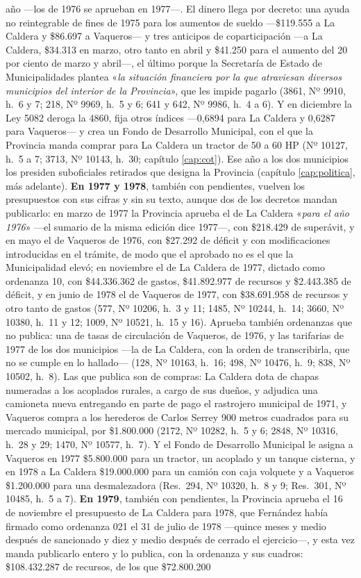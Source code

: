 año ---los de 1976 se aprueban en 1977---. El dinero llega por decreto: una ayuda no reintegrable de fines de 1975 para los aumentos de sueldo ---\$119.555 a La Caldera y \$86.697 a Vaqueros--- y tres anticipos de coparticipación ---a La Caldera, \$34.313 en marzo, otro tanto en abril y \$41.250 para el aumento del 20 por ciento de marzo y abril---, el último porque la Secretaría de Estado de Municipalidades plantea «\textit{la situación financiera por la que atraviesan diversos municipios del interior de la Provincia}», que les impide pagarlo (3861, Nº 9910, h.\ 6 y 7; 218, Nº 9969, h.\ 5 y 6; 641 y 642, Nº 9986, h.\ 4 a 6). Y en diciembre la Ley 5082 deroga la 4860, fija otros índices ---0,6894 para La Caldera y 0,6287 para Vaqueros--- y crea un Fondo de Desarrollo Municipal, con el que la Provincia manda comprar para La Caldera un tractor de 50 a 60 HP (Nº 10127, h.\ 5 a 7; 3713, Nº 10143, h.\ 30; capítulo \ref{cap:cot}). Ese año a los dos municipios los presiden suboficiales retirados que designa la Provincia (capítulo \ref{cap:politica}, más adelante). \textbf{En 1977 y 1978}, también con pendientes, vuelven los presupuestos con sus cifras y sin su texto, aunque dos de los decretos mandan publicarlo: en marzo de 1977 la Provincia aprueba el de La Caldera «\textit{para el año 1976}» ---el sumario de la misma edición dice 1977---, con \$218.429 de superávit, y en mayo el de Vaqueros de 1976, con \$27.292 de déficit y con modificaciones introducidas en el trámite, de modo que el aprobado no es el que la Municipalidad elevó; en noviembre el de La Caldera de 1977, dictado como ordenanza 10, con \$44.336.362 de gastos, \$41.892.977 de recursos y \$2.443.385 de déficit, y en junio de 1978 el de Vaqueros de 1977, con \$38.691.958 de recursos y otro tanto de gastos (577, Nº 10206, h.\ 3 y 11; 1485, Nº 10244, h.\ 14; 3660, Nº 10380, h.\ 11 y 12; 1009, Nº 10521, h.\ 15 y 16). Aprueba también ordenanzas que no publica: una de tasas de circulación de Vaqueros, de 1976, y las tarifarias de 1977 de los dos municipios ---la de La Caldera, con la orden de transcribirla, que no se cumple en lo hallado--- (128, Nº 10163, h.\ 16; 498, Nº 10476, h.\ 9; 838, Nº 10502, h.\ 8). Las que publica son de compras: La Caldera dota de chapas numeradas a los acoplados rurales, a cargo de sus dueños, y adjudica una camioneta nueva entregando en parte de pago el rastrojero municipal de 1971, y Vaqueros compra a los herederos de Carlos Serrey 900 metros cuadrados para su mercado municipal, por \$1.800.000 (2172, Nº 10282, h.\ 5 y 6; 2848, Nº 10316, h.\ 28 y 29; 1470, Nº 10577, h.\ 7). Y el Fondo de Desarrollo Municipal le asigna a Vaqueros en 1977 \$5.800.000 para un tractor, un acoplado y un tanque cisterna, y en 1978 a La Caldera \$19.000.000 para un camión con caja volquete y a Vaqueros \$1.200.000 para una desmalezadora (Res.\ 294, Nº 10320, h.\ 8 y 9; Res.\ 301, Nº 10485, h.\ 5 a 7). \textbf{En 1979}, también con pendientes, la Provincia aprueba el 16 de noviembre el presupuesto de La Caldera para 1978, que Fernández había firmado como ordenanza 021 el 31 de julio de 1978 ---quince meses y medio después de sancionado y diez y medio después de cerrado el ejercicio---, y esta vez manda publicarlo entero y lo publica, con la ordenanza y sus cuadros: \$108.432.287 de recursos, de los que \$72.800.200 
